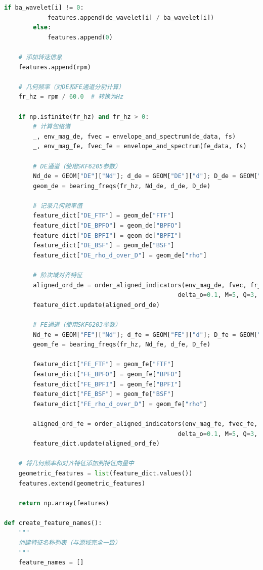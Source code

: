 \documentclass[a4paper]{CPIPC}
\numberwithin{equation}{section}
\begin{document}
\begin{lstlisting}[language=Python, caption=Target Domain Feature Extraction]
        if ba_wavelet[i] != 0:
            features.append(de_wavelet[i] / ba_wavelet[i])
        else:
            features.append(0)
    
    # 添加转速信息
    features.append(rpm)

    # 几何频率（对DE和FE通道分别计算）
    fr_hz = rpm / 60.0  # 转换为Hz

    if np.isfinite(fr_hz) and fr_hz > 0:
        # 计算包络谱 
        _, env_mag_de, fvec = envelope_and_spectrum(de_data, fs)
        _, env_mag_fe, fvec_fe = envelope_and_spectrum(fe_data, fs)
        
        # DE通道（使用SKF6205参数）
        Nd_de = GEOM["DE"]["Nd"]; d_de = GEOM["DE"]["d"]; D_de = GEOM["DE"]["D"]
        geom_de = bearing_freqs(fr_hz, Nd_de, d_de, D_de)
        
        # 记录几何频率值
        feature_dict["DE_FTF"] = geom_de["FTF"]
        feature_dict["DE_BPFO"] = geom_de["BPFO"]
        feature_dict["DE_BPFI"] = geom_de["BPFI"]
        feature_dict["DE_BSF"] = geom_de["BSF"]
        feature_dict["DE_rho_d_over_D"] = geom_de["rho"]
        
        # 阶次域对齐特征
        aligned_ord_de = order_aligned_indicators(env_mag_de, fvec, fr_hz, geom_de, 
                                                delta_o=0.1, M=5, Q=3, prefix="DE_")
        feature_dict.update(aligned_ord_de)

        # FE通道（使用SKF6203参数）
        Nd_fe = GEOM["FE"]["Nd"]; d_fe = GEOM["FE"]["d"]; D_fe = GEOM["FE"]["D"]
        geom_fe = bearing_freqs(fr_hz, Nd_fe, d_fe, D_fe)
        
        feature_dict["FE_FTF"] = geom_fe["FTF"]
        feature_dict["FE_BPFO"] = geom_fe["BPFO"]
        feature_dict["FE_BPFI"] = geom_fe["BPFI"]
        feature_dict["FE_BSF"] = geom_fe["BSF"]
        feature_dict["FE_rho_d_over_D"] = geom_fe["rho"]

        aligned_ord_fe = order_aligned_indicators(env_mag_fe, fvec_fe, fr_hz, geom_fe,
                                                delta_o=0.1, M=5, Q=3, prefix="FE_")
        feature_dict.update(aligned_ord_fe)

    # 将几何频率和对齐特征添加到特征向量中
    geometric_features = list(feature_dict.values())
    features.extend(geometric_features)

    return np.array(features)

def create_feature_names():
    """
    创建特征名称列表（与源域完全一致）
    """
    feature_names = []
    

\end{lstlisting}
\end{document}
